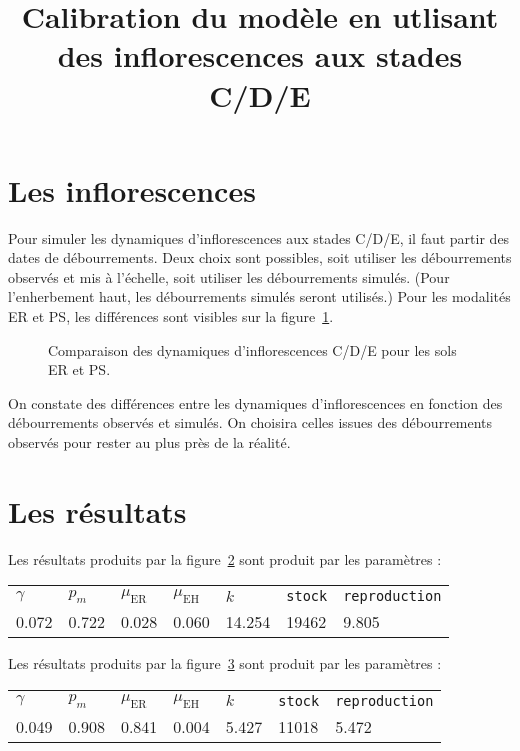 \documentclass[a4paper, 11pt]{article}
\title{Calibration du modèle en utlisant des inflorescences aux stades C/D/E}
\author{}
\date{}
\begin{document}
 \maketitle
 
 \section{Les inflorescences}
 
 Pour simuler les dynamiques d'inflorescences aux stades C/D/E, il faut partir des dates de débourrements.
 Deux choix sont possibles, soit utiliser les débourrements observés et mis à l'échelle, soit utiliser les débourrements simulés.
 (Pour l'enherbement haut, les débourrements simulés seront utilisés.)
 Pour les modalités ER et PS, les différences sont visibles sur la figure~\ref{fig:erps}.
 \begin{figure}[ht]
  \centering
  \caption{Comparaison des dynamiques d'inflorescences C/D/E pour les sols ER et PS.}
  \label{fig:erps}
 \end{figure}
 
 On constate des différences entre les dynamiques d'inflorescences en fonction des débourrements observés et simulés.
 On choisira celles issues des débourrements observés pour rester au plus près de la réalité.
 
 \section{Les résultats}
 
 Les résultats produits par la figure~\ref{fig:arg1} sont produit par les paramètres :
 
 \begin{center}
\begin{tabular}{lllllll}
$\gamma$ & $p_m$ & $\mu_{\text{ER}}$ & $\mu_{\text{EH}}$ & $k$ & \texttt{stock} & \texttt{reproduction}\\
0.072 & 0.722 & 0.028 & 0.060 & 14.254 & 19462 & 9.805
 \end{tabular}
 \end{center}

 
  \begin{figure}[ht]
  \centering
  \caption{}
  \label{fig:arg1}
 \end{figure}
 
 Les résultats produits par la figure~\ref{fig:arg2} sont produit par les paramètres :
 
  \begin{center}
\begin{tabular}{lllllll}
$\gamma$ & $p_m$ & $\mu_{\text{ER}}$ & $\mu_{\text{EH}}$ & $k$ & \texttt{stock} & \texttt{reproduction}\\
0.049 & 0.908 & 0.841 & 0.004 & 5.427 & 11018 & 5.472
 \end{tabular}
 \end{center}
 
 
  \begin{figure}[ht]
  \centering
  \caption{}
  \label{fig:arg2}
 \end{figure}
 
\end{document}
